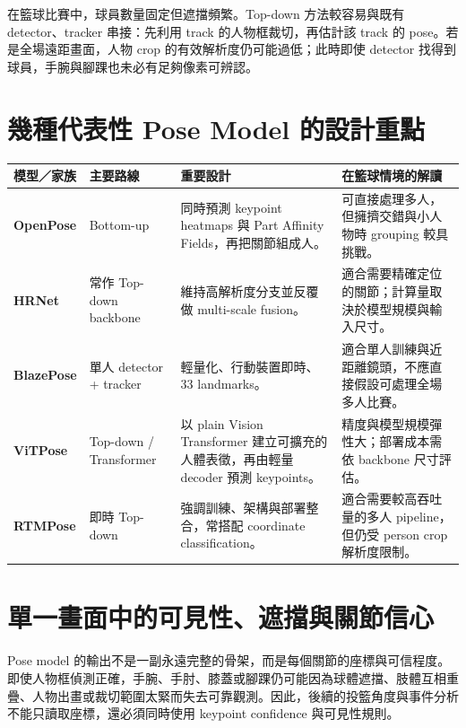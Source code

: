 \documentclass[11pt,a4paper,oneside]{report}
\begin{document}
在籃球比賽中，球員數量固定但遮擋頻繁。Top-down 方法較容易與既有 detector、tracker 串接：先利用 track 的人物框裁切，再估計該 track 的 pose。若是全場遠距畫面，人物 crop 的有效解析度仍可能過低；此時即使 detector 找得到球員，手腕與腳踝也未必有足夠像素可辨認。

\section{幾種代表性 Pose Model 的設計重點}

\begin{tabularx}{\textwidth}{>{\bfseries}p{2.7cm} p{3.1cm} Y Y}
\toprule
模型／家族 & 主要路線 & 重要設計 & 在籃球情境的解讀 \\
\midrule
OpenPose & Bottom-up & 同時預測 keypoint heatmaps 與 Part Affinity Fields，再把關節組成人。 & 可直接處理多人，但擁擠交錯與小人物時 grouping 較具挑戰。\\
HRNet & 常作 Top-down backbone & 維持高解析度分支並反覆做 multi-scale fusion。 & 適合需要精確定位的關節；計算量取決於模型規模與輸入尺寸。\\
BlazePose & 單人 detector + tracker & 輕量化、行動裝置即時、33 landmarks。 & 適合單人訓練與近距離鏡頭，不應直接假設可處理全場多人比賽。\\
ViTPose & Top-down / Transformer & 以 plain Vision Transformer 建立可擴充的人體表徵，再由輕量 decoder 預測 keypoints。 & 精度與模型規模彈性大；部署成本需依 backbone 尺寸評估。\\
RTMPose & 即時 Top-down & 強調訓練、架構與部署整合，常搭配 coordinate classification。 & 適合需要較高吞吐量的多人 pipeline，但仍受 person crop 解析度限制。\\
\bottomrule
\end{tabularx}



\section{單一畫面中的可見性、遮擋與關節信心}

Pose model 的輸出不是一副永遠完整的骨架，而是每個關節的座標與可信程度。即使人物框偵測正確，手腕、手肘、膝蓋或腳踝仍可能因為球體遮擋、肢體互相重疊、人物出畫或裁切範圍太緊而失去可靠觀測。因此，後續的投籃角度與事件分析不能只讀取座標，還必須同時使用 keypoint confidence 與可見性規則。
\end{document}
